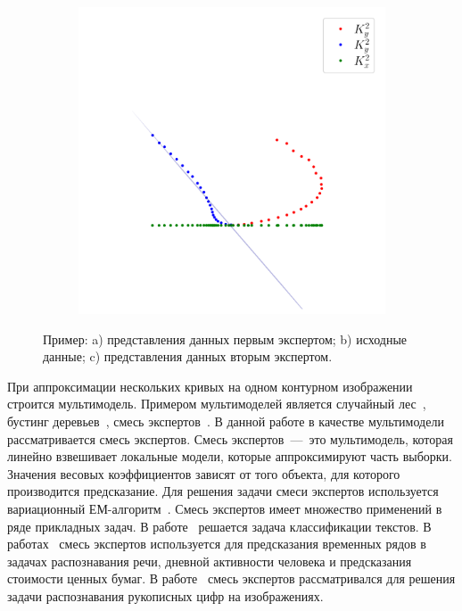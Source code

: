\documentclass[12pt, twoside]{article}
\numberwithin{equation}{section}
\begin{document}
\begin{figure}
\begin{subfigure}[b]{0.3\textwidth}
         \caption{}
         \label{intro:fig2:image}
     \end{subfigure}
     \begin{subfigure}[b]{0.3\textwidth}
         \centering
         \includegraphics[width=\textwidth]{figures/explanation_exp2}
         \caption{}
         \label{intro:fig2:exp2}
     \end{subfigure}

     \caption{Пример: a) представления данных первым экспертом; b) исходные данные; c) представления данных вторым экспертом.}
    \label{intro:fig1}
\end{figure}

При аппроксимации нескольких кривых на одном контурном изображении строится мультимодель. Примером мультимоделей является случайный лес~\cite{Ishwaran2012}, бустинг деревьев~\cite{Tianqi2016}, смесь экспертов~\cite{Yuksel2012}. В данной работе в качестве мультимодели рассматривается смесь экспертов. Смесь экспертов~---~это мультимодель, которая линейно взвешивает локальные модели, которые аппроксимируют часть выборки. Значения весовых коэффициентов зависят от того объекта, для которого производится предсказание. Для решения задачи смеси экспертов используется вариационный ЕМ-алгоритм~\cite{Dempster1977, bishop2006, Peng1996}. Смесь экспертов имеет множество применений в ряде прикладных задач. В работе~\cite{Estabrooks2001} решается задача классификации текстов. В работах~\cite{Cheung1995, Weigend2000, Cao2003, Mossavat2010, Sminchisescu2007, Tuerk2001, Yumlu2003} смесь экспертов используется для предсказания временных рядов в задачах распознавания речи, дневной активности человека и предсказания стоимости ценных бумаг. В работе~\cite{Ebrahimpour2009} смесь экспертов рассматривался для решения задачи распознавания рукописных цифр на изображениях.
\end{document}
